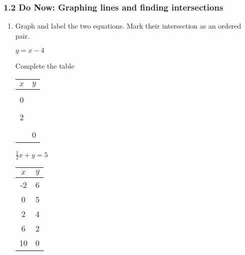 \documentclass[12pt, twoside]{article}
\begin{document}
\subsubsection*{1.2 Do Now: Graphing lines and finding intersections}
\begin{enumerate}
  \item Graph and label the two equations. Mark their intersection as an ordered pair.

  \begin{multicols}{2}
    $y = x-4$
    \begin{flushleft}
      Complete the table \par
      \begin{tabular}{c|c}
        $x$ & $y$ \\
          \hline
          \\
          0 & \underline{\hspace{1cm}} \\
                 \\
          2 &  \underline{\hspace{1cm}} \\
          \\
          \underline{\hspace{1cm}} & 0 \\

      \end{tabular}
      \end{flushleft}

    $\frac{1}{2}x+y = 5$
      \begin{flushleft}
      \begin{tabular}{c|c}
          $x$ & $y$ \\
          \hline
           -2 & 6 \\[5pt]
           0 & 5 \\[5pt]
           2 & 4 \\[5pt]
           6 & 2 \\[5pt]
           10 & 0 \\
          \end{tabular}
        \end{flushleft}
    \end{multicols}

  \begin{center} %
  \end{center}


\end{enumerate}
\end{document}
